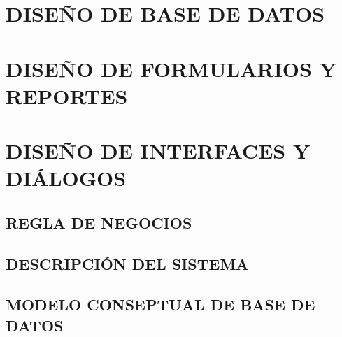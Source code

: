 \chapter*{DISEÑO DE BASE DE DATOS}
\chapter*{DISEÑO DE FORMULARIOS Y REPORTES}
\chapter*{DISEÑO DE INTERFACES Y DIÁLOGOS}

\section{REGLA DE NEGOCIOS}
\section{DESCRIPCIÓN DEL SISTEMA}
\section{MODELO CONSEPTUAL DE BASE DE DATOS}

